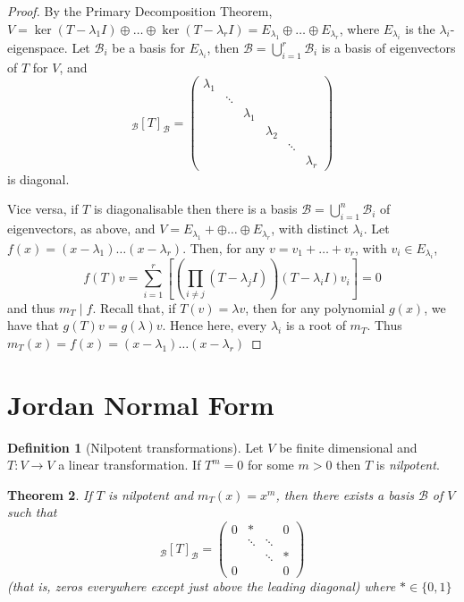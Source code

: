 \documentclass[10pt,fleqn]{article}
\newcommand{\basis}{\mathcal{B}}
\theoremstyle{definition} \newtheorem{defn}{Definition}[section]
\theoremstyle{plain}      \newtheorem{thm}[defn]{Theorem}
\theoremstyle{plain}      \newtheorem{prop}[defn]{Proposition}
\theoremstyle{plain}      \newtheorem{lem}[defn]{Lemma}
\theoremstyle{plain}      \newtheorem{cor}[defn]{Corollary}
\theoremstyle{plain}      \newtheorem{ad}[defn]{Addendum}
\theoremstyle{definition} \newtheorem{ex}[defn]{Example}
\theoremstyle{definition} \newtheorem{rem}[defn]{Remark}
\numberwithin{equation}{subsection}
\begin{document}
\begin{proof}
    By the Primary Decomposition Theorem, $V=\ker(T-\lambda_1I)\oplus\ldots\oplus\ker(T-\lambda_rI)=E_{\lambda_1}\oplus\ldots\oplus E_{\lambda_r}$, where $E_{\lambda_i}$ is the $\lambda_i$-eigenspace.
    Let $\basis_i$ be a basis for $E_{\lambda_i}$, then $\basis=\bigcup_{i=1}^r\basis_i$ is a basis of eigenvectors of $T$ for $V$, and
    \begingroup
    \renewcommand{\arraystretch}{0.8}
    \[
        _{\basis}[T]_{\basis}=
        \left(
        \begin{array}{cccccc}
            \lambda_1 &&&&&\\
            &\ddots&&&&\\
            &&\lambda_1&&&\\
            &&&\lambda_2&&\\
            &&&&\ddots&\\
            &&&&&\lambda_r
        \end{array}
        \right)
    \]
    \endgroup
    is diagonal.

    Vice versa, if $T$ is diagonalisable then there is a basis $\basis=\bigcup_{i=1}^n\basis_i$ of eigenvectors, as above, and $V=E_{\lambda_1}+\oplus\ldots\oplus E_{\lambda_r}$, with distinct $\lambda_i$.
    Let $f(x)=(x-\lambda_1)\ldots(x-\lambda_r)$.
    Then, for any $v=v_1+\ldots+v_r$, with $v_i\in E_{\lambda_i}$,
    \[
        f(T)v=
        \sum_{i=1}^r\left[\left(\prod_{i\neq j}(T-\lambda_jI)\right)(T-\lambda_iI)v_i\right]=
        0
    \]
    and thus $m_T\mid f$.
    Recall that, if $T(v)=\lambda v$, then for any polynomial $g(x)$, we have that $g(T)v=g(\lambda)v$.
    Hence here, every $\lambda_i$ is a root of $m_T$.
    Thus $m_T(x)=f(x)=(x-\lambda_1)\ldots(x-\lambda_r)$
\end{proof}


\section{Jordan Normal Form}

\begin{defn}[Nilpotent transformations]
    Let $V$ be finite dimensional and $T:V\to V$ a linear transformation.
    If $T^m=0$ for some $m>0$ then $T$ is \emph{nilpotent}.
\end{defn}

\begin{thm}\label{jordan-blocks}
    If $T$ is nilpotent and $m_T(x)=x^m$, then there exists a basis $\basis$ of $V$ such that
    \[
        _{\basis}[T]_{\basis}=
        \left(
        \begin{array}{cccc}
        0&*&&0\\
        &\ddots&\ddots&\\
        &&\ddots&*\\
        0&&&0
        \end{array}
        \right)
    \]
    (that is, zeros everywhere except just above the leading diagonal) where $*\in\{0,1\}$
\end{thm}
\end{document}
